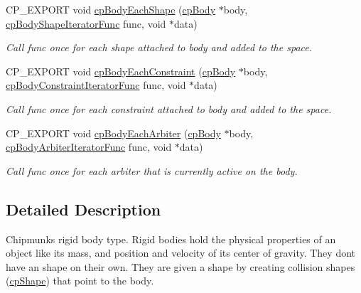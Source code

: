 \begin{DoxyCompactItemize}
\mbox{\label{group__cp_body_ga4c8ab091fe6f38b6d55192170a031bf3}} 
C\+P\+\_\+\+E\+X\+P\+O\+RT void \mbox{\hyperlink{group__cp_body_ga4c8ab091fe6f38b6d55192170a031bf3}{cp\+Body\+Each\+Shape}} (\mbox{\hyperlink{structcp_body}{cp\+Body}} $\ast$body, \mbox{\hyperlink{group__cp_body_gacc4f466cbeaa87fc8b05c0357e1e316d}{cp\+Body\+Shape\+Iterator\+Func}} func, void $\ast$data)
\begin{DoxyCompactList}\small\item\em Call {\ttfamily func} once for each shape attached to {\ttfamily body} and added to the space. \end{DoxyCompactList}\item 
\mbox{\label{group__cp_body_gae497b4998a3379fa232bf4623114010d}} 
C\+P\+\_\+\+E\+X\+P\+O\+RT void \mbox{\hyperlink{group__cp_body_gae497b4998a3379fa232bf4623114010d}{cp\+Body\+Each\+Constraint}} (\mbox{\hyperlink{structcp_body}{cp\+Body}} $\ast$body, \mbox{\hyperlink{group__cp_body_ga8cacab9a606b0dbb1dad405bb0d7ba12}{cp\+Body\+Constraint\+Iterator\+Func}} func, void $\ast$data)
\begin{DoxyCompactList}\small\item\em Call {\ttfamily func} once for each constraint attached to {\ttfamily body} and added to the space. \end{DoxyCompactList}\item 
\mbox{\label{group__cp_body_ga1946a82f1a256333fae25c818a68b3ab}} 
C\+P\+\_\+\+E\+X\+P\+O\+RT void \mbox{\hyperlink{group__cp_body_ga1946a82f1a256333fae25c818a68b3ab}{cp\+Body\+Each\+Arbiter}} (\mbox{\hyperlink{structcp_body}{cp\+Body}} $\ast$body, \mbox{\hyperlink{group__cp_body_gac655e03d7b2d7fd0a870a702f9de0026}{cp\+Body\+Arbiter\+Iterator\+Func}} func, void $\ast$data)
\begin{DoxyCompactList}\small\item\em Call {\ttfamily func} once for each arbiter that is currently active on the body. \end{DoxyCompactList}\end{DoxyCompactItemize}


\subsection{Detailed Description}
Chipmunk\textquotesingle{}s rigid body type. Rigid bodies hold the physical properties of an object like it\textquotesingle{}s mass, and position and velocity of it\textquotesingle{}s center of gravity. They don\textquotesingle{}t have an shape on their own. They are given a shape by creating collision shapes (\mbox{\hyperlink{structcp_shape}{cp\+Shape}}) that point to the body. 

